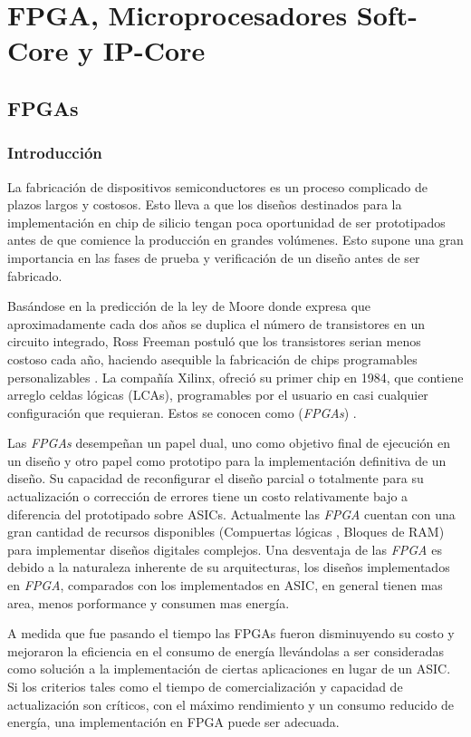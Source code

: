 \chapter{FPGA, Microprocesadores Soft-Core y IP-Core}
\section{FPGAs}
	\subsection{Introducción}
	La fabricación de dispositivos semiconductores es un proceso complicado de plazos largos y costosos. Esto lleva a que los diseños destinados para la 
	implementación en chip de silicio tengan poca oportunidad de ser prototipados antes de que comience la producción en grandes volúmenes. Esto supone
	una gran importancia en las fases de prueba y verificación de un diseño antes de ser fabricado.
	
	Basándose en la predicción de la ley de Moore donde expresa que aproximadamente cada dos años se duplica el número de transistores en un circuito
	integrado\cite{Etiqueta02}, Ross Freeman postuló que los transistores serian menos costoso cada año, haciendo asequible la fabricación de chips
	programables personalizables \cite{Etiqueta03}. La compañía Xilinx, ofreció su primer chip en 1984, que contiene arreglo  celdas lógicas (LCAs),
	programables por el usuario en casi cualquier configuración que requieran. Estos se conocen como (\textit{FPGAs}) .
	
	Las \textit{FPGAs} desempeñan un papel dual, uno como objetivo final de ejecución en un diseño y otro papel como prototipo para la implementación
	definitiva de un diseño. Su capacidad de reconfigurar el diseño parcial o totalmente para su actualización o corrección de errores tiene un costo
	relativamente bajo a diferencia del prototipado sobre ASICs. Actualmente las \textit{FPGA} cuentan con una gran cantidad de recursos disponibles
	(Compuertas lógicas , Bloques de RAM) para implementar diseños digitales complejos. Una desventaja de las \textit{FPGA} es debido a la naturaleza
	inherente de su arquitecturas, los diseños implementados en \textit{FPGA}, comparados con los implementados en ASIC, en general tienen mas area,
	menos porformance y consumen mas energía.
	
	A medida que fue pasando el tiempo las FPGAs fueron disminuyendo su costo y mejoraron la eficiencia en el consumo de energía llevándolas a ser
	consideradas como solución a la implementación de ciertas aplicaciones en lugar de un ASIC. Si los criterios tales como el tiempo de
	comercialización y capacidad de actualización son críticos, con el máximo rendimiento y un consumo reducido de energía, una implementación en FPGA
	puede ser adecuada.
	
